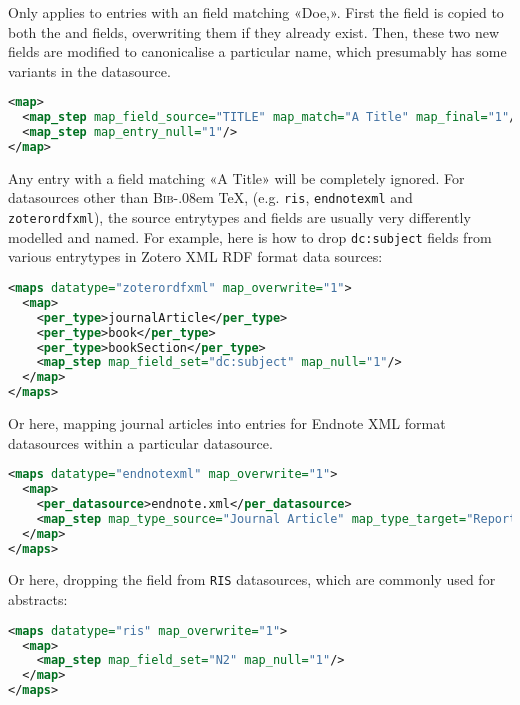 \documentclass{ltxdockit}
\def\BibTeX{\textsc{Bib}\kern-.08em \TeX}
\begin{document}
\noindent Only applies to entries with an  field matching
«Doe,». First the  field is copied to both the
 and  fields, overwriting them if they
already exist. Then, these two new fields are modified to canonicalise a
particular name, which presumably has some variants in the datasource.

\begin{lstlisting}[language=xml,escapechar=;,mathescape=true]
<map>
  <map_step map_field_source="TITLE" map_match="A Title" map_final="1"/>
  <map_step map_entry_null="1"/>
</map>
\end{lstlisting}

\noindent Any entry with a  field matching «A Title»
will be completely ignored.
\bigskip
{}
For datasources other than \BibTeX, (e.g. \verb+ris+, \verb+endnotexml+
and \verb+zoterordfxml+), the source entrytypes and fields are usually very
differently modelled and named. For example, here is how to drop
\verb+dc:subject+ fields from various entrytypes in Zotero XML RDF format data
sources:

\begin{lstlisting}[language=xml,escapechar=+,mathescape=true]
<maps datatype="zoterordfxml" map_overwrite="1">
  <map>
    <per_type>journalArticle</per_type>
    <per_type>book</per_type>
    <per_type>bookSection</per_type>
    <map_step map_field_set="dc:subject" map_null="1"/>
  </map>
</maps>
\end{lstlisting}

\noindent Or here, mapping journal articles into  entries for
Endnote XML format datasources within a particular datasource.

\begin{lstlisting}[language=xml,escapechar=+,mathescape=true]
<maps datatype="endnotexml" map_overwrite="1">
  <map>
    <per_datasource>endnote.xml</per_datasource>
    <map_step map_type_source="Journal Article" map_type_target="Report"/>
  </map>
</maps>
\end{lstlisting}

\noindent Or here, dropping the  field from \verb+RIS+
datasources, which are commonly used for abstracts:

\begin{lstlisting}[language=xml,escapechar=+,mathescape=true]
<maps datatype="ris" map_overwrite="1">
  <map>
    <map_step map_field_set="N2" map_null="1"/>
  </map>
</maps>
\end{lstlisting}
\bigskip
\end{document}
